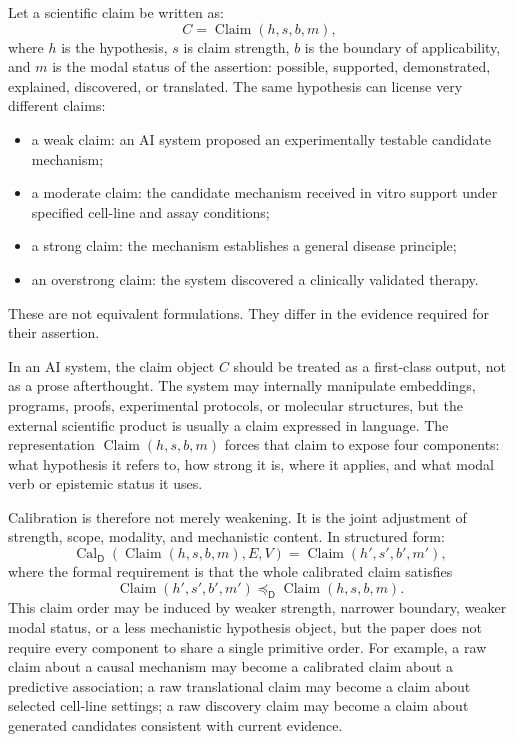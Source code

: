 \documentclass[11pt,a4paper]{article}
\newcommand{\Claim}{\operatorname{Claim}}
\newcommand{\Cal}{\operatorname{Cal}}
\newcommand{\Dom}{\mathsf{D}}
\begin{document}
Let a scientific claim be written as:
\begin{equation}
C=\Claim(h,s,b,m),
\end{equation}
where $h$ is the hypothesis, $s$ is claim strength, $b$ is the boundary of applicability, and $m$ is the modal status of the assertion: possible, supported, demonstrated, explained, discovered, or translated. The same hypothesis can license very different claims:
\begin{itemize}
  \item a weak claim: an AI system proposed an experimentally testable candidate mechanism;
  \item a moderate claim: the candidate mechanism received in vitro support under specified cell-line and assay conditions;
  \item a strong claim: the mechanism establishes a general disease principle;
  \item an overstrong claim: the system discovered a clinically validated therapy.
\end{itemize}
These are not equivalent formulations. They differ in the evidence required for their assertion.

In an AI system, the claim object $C$ should be treated as a first-class output, not as a prose afterthought. The system may internally manipulate embeddings, programs, proofs, experimental protocols, or molecular structures, but the external scientific product is usually a claim expressed in language. The representation $\Claim(h,s,b,m)$ forces that claim to expose four components: what hypothesis it refers to, how strong it is, where it applies, and what modal verb or epistemic status it uses.

Calibration is therefore not merely weakening. It is the joint adjustment of strength, scope, modality, and mechanistic content. In structured form:
\begin{equation}
\Cal_{\Dom}(\Claim(h,s,b,m),E,V)
=\Claim(h',s',b',m'),
\end{equation}
where the formal requirement is that the whole calibrated claim satisfies
\[
\Claim(h',s',b',m')\preceq_{\Dom}\Claim(h,s,b,m).
\]
This claim order may be induced by weaker strength, narrower boundary, weaker modal status, or a less mechanistic hypothesis object, but the paper does not require every component to share a single primitive order. For example, a raw claim about a causal mechanism may become a calibrated claim about a predictive association; a raw translational claim may become a claim about selected cell-line settings; a raw discovery claim may become a claim about generated candidates consistent with current evidence.
\end{document}
